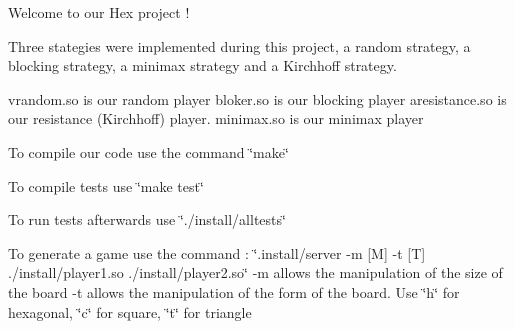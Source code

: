 Welcome to our Hex project !

Three stategies were implemented during this project, a random strategy, a blocking strategy, a minimax strategy and a Kirchhoff strategy.

vrandom.\+so is our random player bloker.\+so is our blocking player aresistance.\+so is our resistance (Kirchhoff) player. minimax.\+so is our minimax player

To compile our code use the command \char`\"{}make\char`\"{}

To compile tests use \char`\"{}make test\char`\"{}

To run tests afterwards use \char`\"{}./install/alltests\char`\"{}

To generate a game use the command \+: \char`\"{}.\+install/server -\/m \mbox{[}\+M\mbox{]} -\/t \mbox{[}\+T\mbox{]} ./install/player1.\+so ./install/player2.\+so\char`\"{} -\/m allows the manipulation of the size of the board -\/t allows the manipulation of the form of the board. Use \char`\"{}h\char`\"{} for hexagonal, \char`\"{}c\char`\"{} for square, \char`\"{}t\char`\"{} for triangle 
